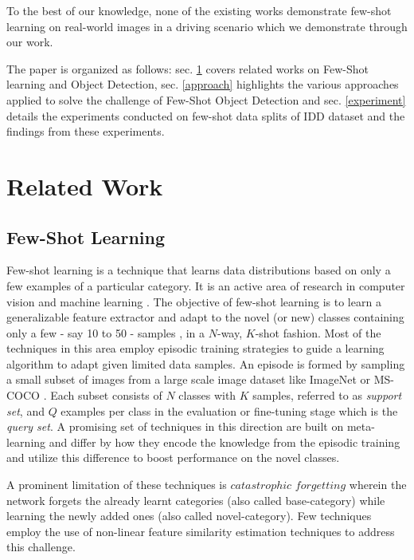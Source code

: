 \documentclass[letterpaper]{article} %
\begin{document}
To the best of our knowledge, none of the existing works demonstrate few-shot learning on real-world images in a driving scenario which we demonstrate through our work.

The paper is organized as follows: sec. \ref{related} covers related works on Few-Shot learning and Object Detection, sec. \ref{approach} highlights the various approaches applied to solve the challenge of Few-Shot Object Detection and sec. \ref{experiment} details the experiments conducted on few-shot data splits of IDD dataset and the findings from these experiments.

\section{Related Work}
\label{related}
\subsection{Few-Shot Learning}
\label{related:fscl}
Few-shot learning is a technique that learns data distributions based on only a few examples of a particular category. It is an active area of research in computer vision and machine learning \cite{closerfewshot}.
The objective of few-shot learning is to learn a generalizable feature extractor and adapt to the novel (or new) classes containing only a few - say 10 to 50 - samples \cite{protonet,matching-net}, in a $N$-way, $K$-shot fashion.
Most of the techniques in this area employ episodic training strategies \cite{local_desc,matching-net,protonet} to guide a learning algorithm to adapt given limited data samples.
An episode is formed by sampling a small subset of images from a large scale image dataset like ImageNet \cite{imagenet} or MS-COCO \cite{coco}. Each subset consists of $N$ classes with $K$ samples, referred to as \emph{support set}, and $Q$ examples per class in the evaluation or fine-tuning stage which is the \emph{query set}.
A  promising set of techniques in this direction are built on meta-learning \cite{maml,local_desc,relation-net,closerfewshot} and differ by how they encode the knowledge from the episodic training and utilize this difference to boost performance on the novel classes.

A prominent limitation of these techniques is $catastrophic$ $forgetting$ wherein the network forgets the already learnt categories (also called base-category) while learning the newly added ones (also called novel-category). Few techniques employ the use of non-linear feature similarity estimation techniques \cite{nonforget} to address this challenge.
\end{document}
